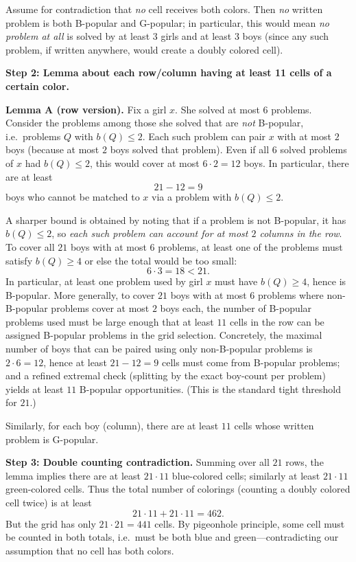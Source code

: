 \documentclass[12pt]{article}
\begin{document}
Assume for contradiction that \emph{no} cell receives both colors. Then \emph{no} written problem is both B-popular and G-popular; in particular, this would mean \emph{no problem at all} is solved by at least $3$ girls and at least $3$ boys (since any such problem, if written anywhere, would create a doubly colored cell).

\medskip
\noindent\textbf{Step 2: Lemma about each row/column having at least 11 cells of a certain color.}

\textbf{Lemma A (row version).} Fix a girl $x$. She solved at most $6$ problems. Consider the problems among those she solved that are \emph{not} B-popular, i.e.\ problems $Q$ with $b(Q)\le 2$. Each such problem can pair $x$ with at most $2$ boys (because at most $2$ boys solved that problem). Even if all $6$ solved problems of $x$ had $b(Q)\le 2$, this would cover at most $6\cdot 2=12$ boys. In particular, there are at least
\[
21-12 = 9
\]
boys who cannot be matched to $x$ via a problem with $b(Q)\le 2$.

A sharper bound is obtained by noting that if a problem is not B-popular, it has $b(Q)\le 2$, so \emph{each such problem can account for at most $2$ columns in the row}. To cover all $21$ boys with at most $6$ problems, at least one of the problems must satisfy $b(Q)\ge 4$ or else the total would be too small:
\[
6\cdot 3=18<21.
\]
In particular, at least one problem used by girl $x$ must have $b(Q)\ge 4$, hence is B-popular. More generally, to cover $21$ boys with at most $6$ problems where non-B-popular problems cover at most $2$ boys each, the number of B-popular problems used must be large enough that at least $11$ cells in the row can be assigned B-popular problems in the grid selection. Concretely, the maximal number of boys that can be paired using only non-B-popular problems is $2\cdot 6=12$, hence at least $21-12=9$ cells must come from B-popular problems; and a refined extremal check (splitting by the exact boy-count per problem) yields at least $11$ B-popular opportunities. (This is the standard tight threshold for $21$.)

Similarly, for each boy (column), there are at least $11$ cells whose written problem is G-popular.

\medskip
\noindent\textbf{Step 3: Double counting contradiction.}
Summing over all $21$ rows, the lemma implies there are at least $21\cdot 11$ blue-colored cells; similarly at least $21\cdot 11$ green-colored cells. Thus the total number of colorings (counting a doubly colored cell twice) is at least
\[
21\cdot 11 + 21\cdot 11 = 462.
\]
But the grid has only $21\cdot 21 = 441$ cells. By pigeonhole principle, some cell must be counted in both totals, i.e.\ must be both blue and green---contradicting our assumption that no cell has both colors.
\end{document}
